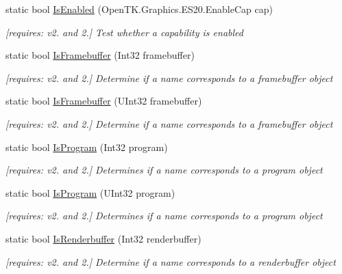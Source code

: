 \begin{DoxyCompactItemize}
static bool \hyperlink{class_open_t_k_1_1_graphics_1_1_e_s20_1_1_g_l_a4933dbae7d1ac20a659b8e2e1fb220b1}{Is\-Enabled} (Open\-T\-K.\-Graphics.\-E\-S20.\-Enable\-Cap cap)
\begin{DoxyCompactList}\small\item\em \mbox{[}requires\-: v2. and 2.\mbox{]} Test whether a capability is enabled \end{DoxyCompactList}\item 
static bool \hyperlink{class_open_t_k_1_1_graphics_1_1_e_s20_1_1_g_l_a472db29494940bccdb63486e907b6c65}{Is\-Framebuffer} (Int32 framebuffer)
\begin{DoxyCompactList}\small\item\em \mbox{[}requires\-: v2. and 2.\mbox{]} Determine if a name corresponds to a framebuffer object \end{DoxyCompactList}\item 
static bool \hyperlink{class_open_t_k_1_1_graphics_1_1_e_s20_1_1_g_l_aed88d7645b96c3769f0068db7e116cd2}{Is\-Framebuffer} (U\-Int32 framebuffer)
\begin{DoxyCompactList}\small\item\em \mbox{[}requires\-: v2. and 2.\mbox{]} Determine if a name corresponds to a framebuffer object \end{DoxyCompactList}\item 
static bool \hyperlink{class_open_t_k_1_1_graphics_1_1_e_s20_1_1_g_l_a4fa2b4cc183e67c902020c4de6ce1de6}{Is\-Program} (Int32 program)
\begin{DoxyCompactList}\small\item\em \mbox{[}requires\-: v2. and 2.\mbox{]} Determines if a name corresponds to a program object \end{DoxyCompactList}\item 
static bool \hyperlink{class_open_t_k_1_1_graphics_1_1_e_s20_1_1_g_l_a1f443775c7d2c931763c67a8bd62081c}{Is\-Program} (U\-Int32 program)
\begin{DoxyCompactList}\small\item\em \mbox{[}requires\-: v2. and 2.\mbox{]} Determines if a name corresponds to a program object \end{DoxyCompactList}\item 
static bool \hyperlink{class_open_t_k_1_1_graphics_1_1_e_s20_1_1_g_l_ae39e6281e411924fe1f9feaf332f552c}{Is\-Renderbuffer} (Int32 renderbuffer)
\begin{DoxyCompactList}\small\item\em \mbox{[}requires\-: v2. and 2.\mbox{]} Determine if a name corresponds to a renderbuffer object \end{DoxyCompactList}\item 

\end{DoxyCompactItemize}

